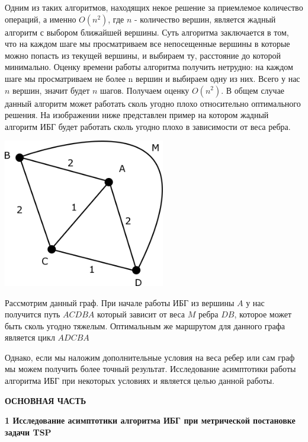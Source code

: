 \documentclass[a4paper, 14pt]{extarticle}
\begin{document}
Одним из таких алгоритмов, находящих некое решение за приемлемое количество операций, а именно $O(n^{2})$, где $n$ - количество вершин, является жадный алгоритм с выбором ближайшей вершины. Суть алгоритма заключается в том, что на каждом шаге мы просматриваем все непосещенные вершины в которые можно попасть из текущей вершины, и выбираем ту, расстояние до которой минимально. Оценку времени работы алгоритма получить нетрудно: на каждом шаге мы просматриваем не более n вершин и выбираем одну из них. Всего у нас $n$ вершин, значит будет $n$ шагов. Получаем оценку $O(n^{2})$. В общем случае данный алгоритм может работать сколь угодно плохо относительно оптимального решения. На изображении ниже представлен пример на котором жадный алгоритм ИБГ будет работать сколь угодно плохо в зависимости от веса ребра.

\begin{center}
\includegraphics[width=200pt]{ris_example.png}
\end{center}

Рассмотрим данный граф. При начале работы ИБГ из вершины $A$ у нас получится путь $ACDBA$ который зависит от веса $M$ ребра $DB$, которое может быть сколь угодно тяжелым. Оптимальным же маршрутом для данного графа является цикл $ADCBA$

Однако, если мы наложим дополнительные условия на веса ребер или сам граф мы можем получить более точный результат. Исследование асимптотики работы алгоритма ИБГ при некоторых условиях и является целью данной работы. \newline

\newpage

\begin{center}
 \textbf{ОСНОВНАЯ ЧАСТЬ}\\
\end{center}

\textbf{1 Исследование асимптотики алгоритма ИБГ при метрической постановке задачи TSP}\\
\end{document}
